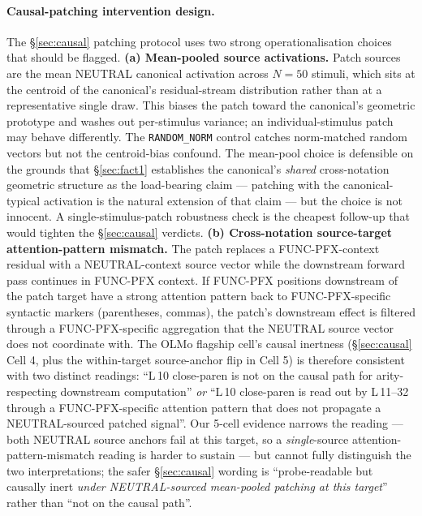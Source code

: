 \documentclass[11pt,letterpaper]{article}
\begin{document}
\paragraph{Causal-patching intervention design.} The
\S\ref{sec:causal} patching protocol uses two strong
operationalisation choices that should be flagged.
\textbf{(a) Mean-pooled source activations.} Patch sources are the
mean NEUTRAL canonical activation across $N = 50$ stimuli, which
sits at the centroid of the canonical's residual-stream distribution
rather than at a representative single draw. This biases the patch
toward the canonical's geometric prototype and washes out
per-stimulus variance; an individual-stimulus patch may behave
differently. The \texttt{RANDOM\_NORM} control catches norm-matched
random vectors but not the centroid-bias confound. The mean-pool
choice is defensible on the grounds that \S\ref{sec:fact1}
establishes the canonical's \emph{shared} cross-notation geometric
structure as the load-bearing claim --- patching with the
canonical-typical activation is the natural extension of that claim
--- but the choice is not innocent. A single-stimulus-patch
robustness check is the cheapest follow-up that would tighten the
\S\ref{sec:causal} verdicts. \textbf{(b) Cross-notation source-target
attention-pattern mismatch.} The patch replaces a FUNC-PFX-context
residual with a NEUTRAL-context source vector while the downstream
forward pass continues in FUNC-PFX context. If FUNC-PFX positions
downstream of the patch target have a strong attention pattern back
to FUNC-PFX-specific syntactic markers (parentheses, commas), the
patch's downstream effect is filtered through a FUNC-PFX-specific
aggregation that the NEUTRAL source vector does not coordinate with.
The OLMo flagship cell's causal inertness (\S\ref{sec:causal} Cell 4,
plus the within-target source-anchor flip in Cell 5) is therefore
consistent with two distinct readings: ``L\,10 close-paren is not
on the causal path for arity-respecting downstream computation''
\emph{or} ``L\,10 close-paren is read out by L\,11--32 through a
FUNC-PFX-specific attention pattern that does not propagate a
NEUTRAL-sourced patched signal''. Our 5-cell evidence narrows the
reading --- both NEUTRAL source anchors fail at this target, so a
\emph{single}-source attention-pattern-mismatch reading is harder to
sustain --- but cannot fully distinguish the two interpretations;
the safer \S\ref{sec:causal} wording is ``probe-readable but
causally inert \emph{under NEUTRAL-sourced mean-pooled patching at
this target}'' rather than ``not on the causal path''.
\end{document}
